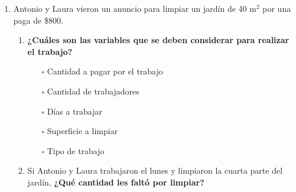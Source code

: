 \documentclass[11pt]{book}
\begin{document}
\begin{enumerate}
  \item Antonio y Laura vieron un anuncio para limpiar un jardín de 40 m$^2$ por una paga de \$800.
        \begin{enumerate}
          \item \textbf{¿Cuáles son las variables que se deben considerar para realizar el trabajo?}
                \begin{enumerate}
                  \item[\color{colorrds}\Large$\square$] Cantidad a pagar por el trabajo
                  \item[\color{colorrds}\Large$\square$] Cantidad de trabajadores
                  \item[\color{colorrds}\Large$\square$] Días a trabajar
                  \item[\color{colorrds}\Large$\square$] Superficie a limpiar
                  \item[\color{colorrds}\Large$\square$] Tipo de trabajo
                \end{enumerate}

          \item Si Antonio y Laura trabajaron el lunes y limpiaron la cuarta parte del jardín, \textbf{¿Qué cantidad les faltó por limpiar?}\\


\end{enumerate}
\end{enumerate}
\end{document}
